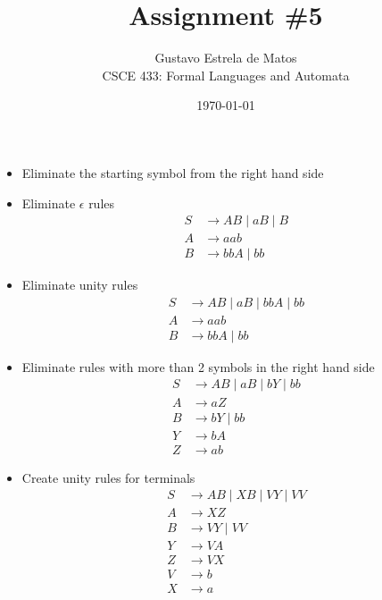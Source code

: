 \documentclass[11pt]{article}
\newcommand{\question}[2] {\vspace{0.3in}\noindent{\subsection*{Question #1. #2} \vspace{0.15in}}}
\begin{document}
\title{Assignment \#5} %
\author{\Large Gustavo Estrela de Matos\\ %
CSCE 433: Formal Languages and Automata} %
\date{\today} 

\maketitle

\question{1}{}  
\begin{itemize}
\item{Eliminate the starting symbol from the right hand side}
\item{Eliminate $\epsilon$ rules}
\begin{equation*}
\begin{aligned}
    S & \rightarrow AB \mid aB \mid B \\
    A & \rightarrow aab \\
    B & \rightarrow bbA \mid bb
\end{aligned}
\end{equation*}
\item{Eliminate unity rules}
\begin{equation*}
\begin{aligned}
    S & \rightarrow AB \mid aB \mid bbA \mid bb \\
    A & \rightarrow aab \\
    B & \rightarrow bbA \mid bb 
\end{aligned}
\end{equation*}
\item{Eliminate rules with more than 2 symbols in the right hand side}
\begin{equation*}
\begin{aligned}
    S & \rightarrow AB \mid aB \mid bY \mid bb \\  
    A & \rightarrow aZ \\
    B & \rightarrow bY \mid bb \\
    Y & \rightarrow bA \\
    Z & \rightarrow ab 
\end{aligned}
\end{equation*}
\item{Create unity rules for terminals}
\begin{equation*}
\begin{aligned}
    S & \rightarrow AB \mid XB \mid VY \mid VV \\  
    A & \rightarrow XZ \\
    B & \rightarrow VY \mid VV \\
    Y & \rightarrow VA \\
    Z & \rightarrow VX \\
    V & \rightarrow b \\
    X & \rightarrow a
\end{aligned}
\end{equation*}
\end{itemize}
\end{document}
